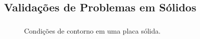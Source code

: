 \documentclass{beamer}
\begin{document}
\subsection{Validações de Problemas em Sólidos}
\begin{frame}
  \frametitle{\subsecname}
  
  \begin{minipage}{.48\textwidth}
    \centering
    \begin{figure}
       {\raggedleft \tiny Condições de contorno em uma placa sólida.}
    \end{figure}
  \end{minipage}
  \hfill
  \begin{minipage}{.48\textwidth}
    \begin{figure}
\end{figure}
\end{minipage}
\end{frame}
\end{document}
